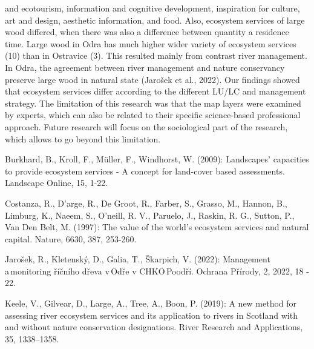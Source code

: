 {and ecotourism, information and cognitive development, inspiration for culture, art and design, aesthetic information, and food. Also, ecosystem services of large wood differed, when there was also a difference between quantity a residence time. Large wood in Odra  has much higher wider variety of ecosystem services (10) than in Ostravice (3). This resulted mainly from contrast river management. In Odra, the agreement between river management and nature conservancy preserve large wood in natural state (Jarošek et al., 2022). Our findings showed that ecosystem services differ according to the different LU/LC and management strategy. The limitation of this research was that the map layers were examined by experts, which can also be related  to their specific science-based professional approach. Future research will focus on the sociological part of the research, which allows to go beyond this limitation.
}
{
Burkhard, B., Kroll, F., Müller, F., Windhorst, W. (2009): Landscapes' capacities to provide ecosystem services - A concept for land-cover based assessments. Landscape Online, 15, 1-22.

Costanza, R., D'arge, R., De Groot, R., Farber, S., Grasso, M., Hannon, B., Limburg, K., Naeem, S., O'neill, R. V., Paruelo, J., Raskin, R. G., Sutton, P., Van Den Belt, M. (1997): The value of the world's ecosystem services and natural capital. Nature, 6630, 387, 253-260. 

Jarošek, R., Kletenský, D., Galia, T., Škarpich, V. (2022): Management a monitoring říčního dřeva v Odře v CHKO Poodří. Ochrana Přírody, 2, 2022, 18 - 22.

Keele, V., Gilvear, D., Large, A., Tree, A., Boon, P. (2019): A new method for assessing river ecosystem services and its application to rivers in Scotland with and without nature conservation designations. River Research and Applications, 35, 1338–1358.
}

